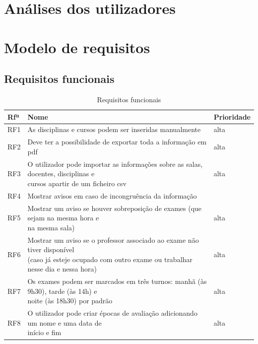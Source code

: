 \documentclass[11pt, twoside]{report}
\begin{document}
 	

	\chapter{Análises dos utilizadores}
	
	\chapter{Modelo de requisitos}
	
	
	\section{Requisitos funcionais}
	
	\begin{table}[H]
		\centering
		\caption{Requisitos funcionais}	
		\vspace{0.5cm}
		\begin{tabular}{|l|l|l|}
			\hline
			Rfª & Nome & Prioridade\\
			\hline
			RF1 & As disciplinas e cursos podem ser inseridas manualmente& alta\\
			\hline
			RF2 & Deve ter a possibilidade de exportar toda a informação em pdf&alta\\
			\hline
			RF3 &\makecell[l]{O utilizador pode importar as informações sobre as salas, docentes, disciplinas e\\ cursos apartir de um ficheiro csv}&alta\\
			\hline
			RF4 &Mostrar avisos em caso de incongruência da informação&\\
			\hline
			RF5 &\makecell[l]{Mostrar um aviso se houver sobreposição de exames (que sejam na mesma hora e \\na mesma sala)}&alta\\
			\hline
			RF6& \makecell[l]{Mostrar um aviso se o professor associado ao exame não tiver disponível \\(caso já esteje ocupado com outro exame ou trabalhar nesse dia e nessa hora)}&alta\\
			\hline
			RF7& \makecell[l]{Os exames podem ser marcados em três turnos: manhã (às 9h30), tarde (às 14h) e \\noite (às 18h30) por padrão}& alta\\
			\hline
			RF8& \makecell[l]{O utilizador pode criar épocas de avaliação adicionando um nome e uma data de \\início e fim}& alta\\
			\hline

\end{tabular}
\end{table}
\end{document}
